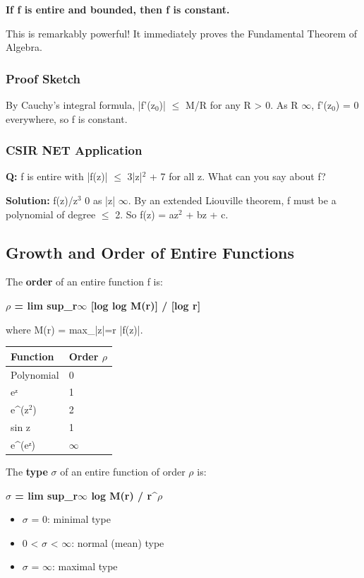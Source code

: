 \documentclass[12pt,a4paper,openany]{book}
\begin{document}
{{\textbf{If f is entire and bounded, then f is constant.}

This is remarkably powerful! It immediately proves the Fundamental Theorem of Algebra.

\subsubsection{Proof Sketch}
By Cauchy's integral formula, |f'(z$_0$)| $\leq$ M/R for any R > 0. As R  $\infty$, f'(z$_0$) = 0 everywhere, so f is constant.

\subsubsection{ CSIR NET Application}
\textbf{Q:} f is entire with |f(z)| $\leq$ 3|z|$^2$ + 7 for all z. What can you say about f?

\textbf{Solution:} f(z)/z$^3$  0 as |z|  $\infty$. By an extended Liouville theorem, f must be a polynomial of degree $\leq$ 2. So f(z) = az$^2$ + bz + c.

\subsection{Growth and Order of Entire Functions}

The \textbf{order} of an entire function f is:

\textbf{$\rho$ = lim sup_{r$\infty$} [log log M(r)] / [log r]}

where M(r) = max_{|z|=r} |f(z)|.

\begin{center}
\begin{tabular}{|l|l|}
\hline
\textbf{Function} & \textbf{Order $\rho$} \\
\hline
Polynomial & 0 \\
\hline
eᶻ & 1 \\
\hline
e^(z$^2$) & 2 \\
\hline
sin z & 1 \\
\hline
e^(eᶻ) & $\infty$ \\
\hline
\end{tabular}
\end{center}

The \textbf{type} $\sigma$ of an entire function of order $\rho$ is:

\textbf{$\sigma$ = lim sup_{r$\infty$} log M(r) / r^$\rho$}

\begin{itemize}[leftmargin=*]
  \item $\sigma$ = 0: minimal type
  \item 0 < $\sigma$ < $\infty$: normal (mean) type
  \item $\sigma$ = $\infty$: maximal type
\end{itemize}

}}
\end{document}
